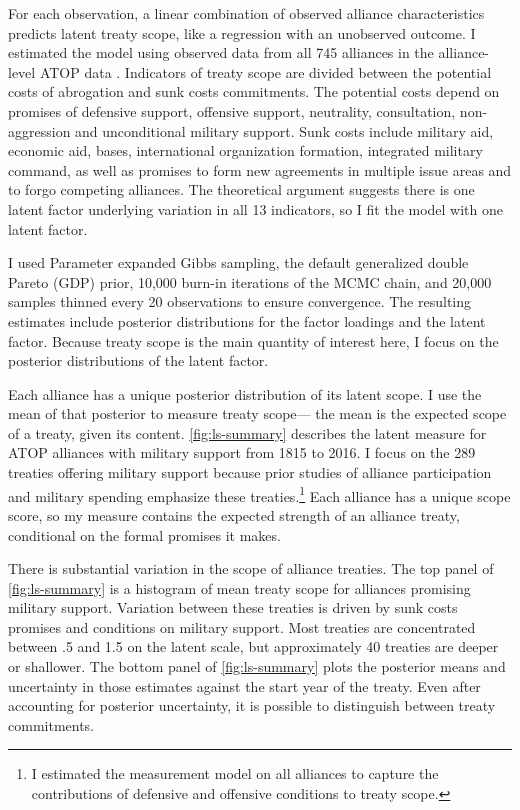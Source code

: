 \documentclass[12pt]{article}
\begin{document}
For each observation, a linear combination of observed alliance characteristics predicts latent treaty scope, like a regression with an unobserved outcome.  
I estimated the model using observed data from all 745 alliances in the alliance-level ATOP data \citep{Leedsetal2002}. 
Indicators of treaty scope are divided between the potential costs of abrogation and sunk costs commitments.
The potential costs depend on promises of defensive support, offensive support, neutrality, consultation, non-aggression and unconditional military support. 
Sunk costs include military aid, economic aid, bases, international organization formation, integrated military command, as well as promises to form new agreements in multiple issue areas and to forgo competing alliances. 
The theoretical argument suggests there is one latent factor underlying variation in all 13 indicators, so I fit the model with one latent factor. 


I used Parameter expanded Gibbs sampling, the default generalized double Pareto (GDP) prior, 10,000 burn-in iterations of the MCMC chain, and 20,000 samples thinned every 20 observations to ensure convergence. 
The resulting estimates include posterior distributions for the factor loadings and the latent factor. 
Because treaty scope is the main quantity of interest here, I focus on the posterior distributions of the latent factor. 


Each alliance has a unique posterior distribution of its latent scope. 
I use the mean of that posterior to measure treaty scope--- the mean is the expected scope of a treaty, given its content. 
\autoref{fig:ls-summary} describes the latent measure for ATOP alliances  with military support from 1815 to 2016.
I focus on the 289 treaties offering military support because prior studies of alliance participation and military spending emphasize these treaties.\footnote{
I estimated the measurement model on all alliances to capture the contributions of defensive and offensive conditions to treaty scope.}
Each alliance has a unique scope score, so my measure contains the expected strength of an alliance treaty, conditional on the formal promises it makes. 


There is substantial variation in the scope of alliance treaties. 
The top panel of \autoref{fig:ls-summary} is a histogram of mean treaty scope for alliances promising military support. 
Variation between these treaties is driven by sunk costs promises and conditions on military support. 
Most treaties are concentrated between .5 and 1.5 on the latent scale, but approximately 40 treaties are deeper or shallower. 
The bottom panel of \autoref{fig:ls-summary} plots the posterior means and uncertainty in those estimates against the start year of the treaty. 
Even after accounting for posterior uncertainty, it is possible to distinguish between treaty commitments. 
\end{document}
